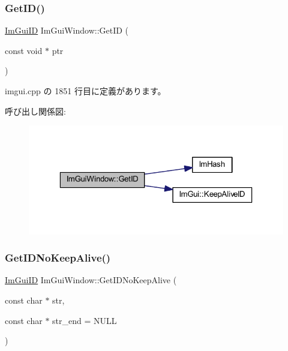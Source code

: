 \subsubsection{\texorpdfstring{Get\+I\+D()}{GetID()}\hspace{0.1cm}{\footnotesize\ttfamily [2/2]}}
{\footnotesize\ttfamily \mbox{\hyperlink{imgui_8h_a1785c9b6f4e16406764a85f32582236f}{Im\+Gui\+ID}} Im\+Gui\+Window\+::\+Get\+ID (\begin{DoxyParamCaption}\item[{const void $\ast$}]{ptr }\end{DoxyParamCaption})}



 imgui.\+cpp の 1851 行目に定義があります。

呼び出し関係図\+:\nopagebreak
\begin{figure}[H]
\begin{center}
\leavevmode
\includegraphics[width=323pt]{struct_im_gui_window_aae21dffb343cabca9414499b827912a8_cgraph}
\end{center}
\end{figure}
\mbox{\label{struct_im_gui_window_adc0a43f74a0b53a15a4bc4fea05524fe}} 
\subsubsection{\texorpdfstring{Get\+I\+D\+No\+Keep\+Alive()}{GetIDNoKeepAlive()}}
{\footnotesize\ttfamily \mbox{\hyperlink{imgui_8h_a1785c9b6f4e16406764a85f32582236f}{Im\+Gui\+ID}} Im\+Gui\+Window\+::\+Get\+I\+D\+No\+Keep\+Alive (\begin{DoxyParamCaption}\item[{const char $\ast$}]{str,  }\item[{const char $\ast$}]{str\+\_\+end = {\ttfamily NULL} }\end{DoxyParamCaption})}



